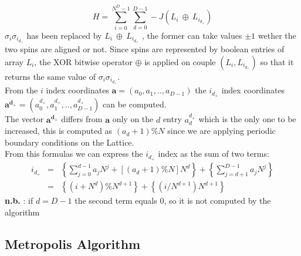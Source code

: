 \documentclass[11pt,a4paper]{article}
\begin{document}
\begin{equation}
H = \sum_{i=0}^{N^D-1}\sum_{d=0}^{D-1}-J(L_i \ \oplus \ L_{i_{d_+}})
\end{equation}
$\sigma_i\sigma_{i_{d_+}}$ has been replaced by $L_i \ \oplus \ L_{i_{d_+}}$ , the former can take values $\pm1$ wether the two spins are aligned or not. Since spins are represented by boolean entries of array $L_i$, the XOR bitwise operator $\oplus$ is applied on couple $(L_i,L_{i_{d_+}})$ so that it returns the same value of $\sigma_i\sigma_{i_{d_+}}$. \\
\vspace{0.1cm}
From the $i$ index coordinates $\mathbf{a} = (a_0,a_1,..,a_{D-1})$ the $i_{d_+}$ index coordinates\\
$\mathbf{a^{d_+}} = (a^{d_+}_0,a^{d_+}_1,..,a^{d_+}_{D-1})$ can be computed. \\
The vector $\mathbf{a^{d_+}}$ differs from $\mathbf{a}$
only on the $d$ entry $a^{d_+}_d$ which is the only one to be increased, this is computed as $(a_d+1)\%N$ since we are applying periodic boundary conditions on the Lattice. \\
From this formulas we can express the $i_{d_+}$ index as the sum of two terms:
\begin{eqnarray*}
  i_{d_+} &=& \left\{ \sum_{j = 0}^{d-1}a_jN^j + [(a_d + 1)\%N]N^d \right\} + \left\{ \sum_{j = d+1}^{D-1}a_jN^j \right\}  \\
          &=& \left\{(i + N^d)\%N^{d+1} \right\}  +  \left\{ (i/N^{d+1})N^{d+1}  \right\}
\end{eqnarray*}
\textbf{n.b.} : if $d = D-1$ the second term equals 0, so it is not computed by the algorithm
\newpage


\subsection{Metropolis Algorithm}
\end{document}
